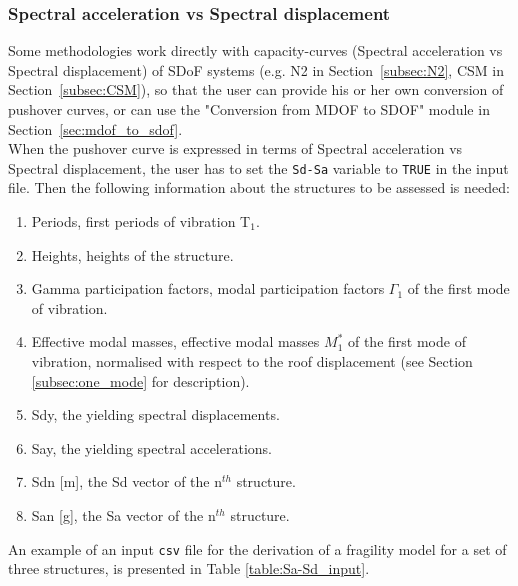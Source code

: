 \subsubsection{Spectral acceleration vs Spectral displacement}
\label{subsubsec:Sa-Sd}
Some methodologies work directly with capacity-curves (Spectral acceleration vs Spectral displacement) of SDoF systems (e.g. N2 in Section~\ref{subsec:N2}, CSM in Section~\ref{subsec:CSM}), so that the user can provide his or her own conversion of pushover curves, or can use the "Conversion from MDOF to SDOF" module in Section~\ref{sec:mdof_to_sdof}.\\
When the pushover curve is expressed in terms of Spectral acceleration vs Spectral displacement, the user has to set the \verb=Sd-Sa= variable to \verb=TRUE= in the input file. Then the following information about the structures to be assessed is needed:\\

\begin{enumerate}
\item Periods, first periods of vibration T$_1$.
\item Heights, heights of the structure.
\item Gamma participation factors, modal participation factors $\Gamma_1$ of the first mode of vibration.
\item Effective modal masses, effective modal masses $M_{1}^{*}$ of the first mode of vibration, normalised with respect to the roof displacement (see Section \ref{subsec:one_mode} for description).
\item Sdy, the yielding spectral displacements.
\item Say, the yielding spectral accelerations.
\item Sdn [m], the Sd vector of the n$^{th}$ structure.
\item San [g], the Sa vector of the n$^{th}$ structure. \\
\end{enumerate}

An example of an input \verb=csv= file for the derivation of a fragility model for a set of three structures, is presented in Table \ref{table:Sa-Sd_input}.

